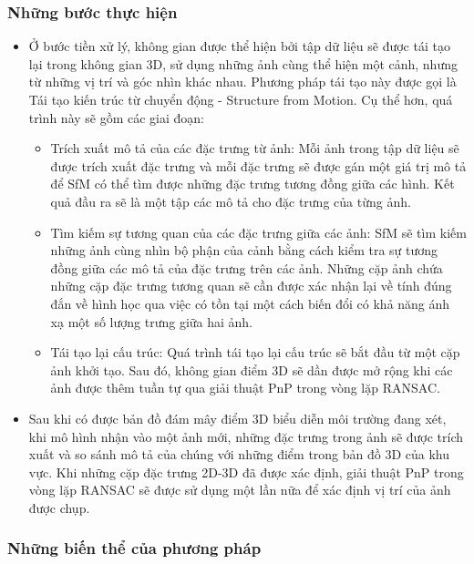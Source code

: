 \subsubsection*{Những bước thực hiện}
\begin{itemize}
    \item Ở bước tiền xử lý, không gian được thể hiện bởi tập dữ liệu sẽ được tái tạo lại trong không gian 3D, sử dụng những ảnh cùng thể hiện một cảnh, nhưng từ những vị trí và góc nhìn khác nhau. Phương pháp tái tạo này được gọi là Tái tạo kiến trúc từ chuyển động - Structure from Motion. Cụ thể hơn, quá trình này sẽ gồm các giai đoạn:
          \begin{itemize}
              \item Trích xuất mô tả của các đặc trưng từ ảnh: Mỗi ảnh trong tập dữ liệu sẽ được trích xuất đặc trưng và mỗi đặc trưng sẽ được gán một giá trị mô tả để SfM có thể tìm được những đặc trưng tương đồng giữa các hình. Kết quả đầu ra sẽ là một tập các mô tả cho đặc trưng của từng ảnh.
              \item Tìm kiếm sự tương quan của các đặc trưng giữa các ảnh: SfM sẽ tìm kiếm những ảnh cùng nhìn bộ phận của cảnh bằng cách kiểm tra sự tương đồng giữa các mô tả của đặc trưng trên các ảnh. Những cặp ảnh chứa những cặp đặc trưng tương quan sẽ cần được xác nhận lại về tính đúng đắn về hình học qua việc có tồn tại một cách biến đổi có khả năng ánh xạ một số lượng trưng giữa hai ảnh.
              \item Tái tạo lại cấu trúc: Quá trình tái tạo lại cấu trúc sẽ bắt đầu từ một cặp ảnh khởi tạo. Sau đó, không gian điểm 3D sẽ dần được mở rộng khi các ảnh được thêm tuần tự qua giải thuật PnP trong vòng lặp RANSAC.
          \end{itemize}
    \item Sau khi có được bản đồ đám mây điểm 3D biểu diễn môi trường đang xét, khi mô hình nhận vào một ảnh mới, những đặc trưng trong ảnh sẽ được trích xuất và so sánh mô tả của chúng với những điểm trong bản đồ 3D của khu vực. Khi những cặp đặc trưng 2D-3D đã được xác định, giải thuật PnP trong vòng lặp RANSAC sẽ được sử dụng một lần nữa để xác định vị trí của ảnh được chụp.
\end{itemize}
\subsubsection*{Những biến thể của phương pháp}

